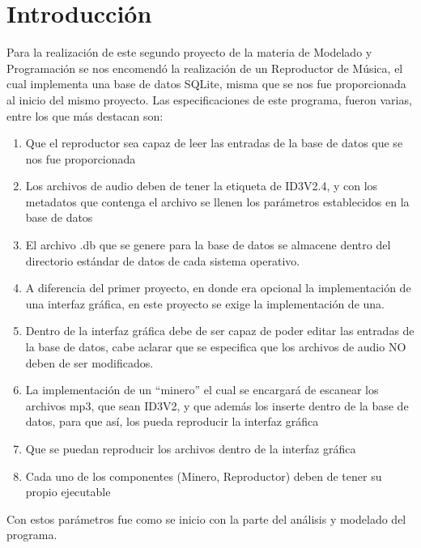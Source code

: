 \section{Introducción}
Para la realización de este segundo proyecto de la materia de Modelado y Programación se nos encomendó la realización de un Reproductor de Música, el cual implementa una base de datos SQLite, misma que se nos fue proporcionada al inicio del mismo proyecto.
Las especificaciones de este programa, fueron varias, entre los que más destacan son:
\begin{enumerate}
    \item Que el reproductor sea capaz de leer las entradas de la base de datos que se nos fue proporcionada
    \item Los archivos de audio deben de tener la etiqueta de ID3V2.4, y con los metadatos que contenga el archivo se llenen los parámetros establecidos en la base de datos
    \item El archivo .db que se genere para la base de datos se almacene dentro del directorio estándar de datos de cada sistema operativo.
    \item A diferencia del primer proyecto, en donde era opcional la implementación de una interfaz gráfica, en este proyecto se exige la implementación de una.
    \item Dentro de la interfaz gráfica debe de ser capaz de poder editar las entradas de la base de datos, cabe aclarar que se especifica que los archivos de audio NO deben de ser modificados.
    \item La implementación de un ``minero'' el cual se encargará de escanear los archivos mp3, que sean ID3V2, y que además los inserte dentro de la base de datos, para que así, los pueda reproducir la interfaz gráfica
    \item Que se puedan reproducir los archivos dentro de la interfaz gráfica
    \item Cada uno de los componentes (Minero, Reproductor) deben de tener su propio ejecutable
\end{enumerate}
Con estos parámetros fue como se inicio con la parte del análisis y modelado del programa.